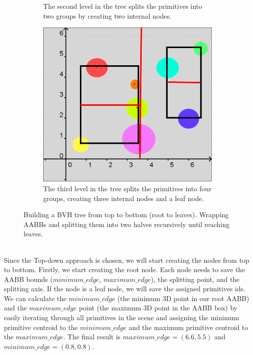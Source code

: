 \documentclass[11pt,a4paper]{article}
\begin{document}
\begin{figure}[h]
\begin{subfigure}[t]{0.3\textwidth}
         \captionsetup{justification=centering,margin=0.1cm}
         \caption{The second level in the tree splits the primitives into two groups by creating two internal nodes.}
         \label{fig:pi_5000}
     \end{subfigure}
     \hfill
     \begin{subfigure}[t]{0.3\textwidth}
         \centering
         \includegraphics[width=\textwidth]{images/example_bvh/4_g.png}
         \captionsetup{justification=centering,margin=0.1cm}
         \caption{The third level in the tree splits the primitives into four groups, creating three internal nodes and a leaf node.}
         \label{fig:pi_18000}
     \end{subfigure}
        \captionsetup{justification=centering,margin=2cm}
        \caption{Building a BVH tree from top to bottom (root to leaves). Wrapping AABBs and splitting them into two halves recursively until reaching leaves.}
        \label{fig:three graphs}
\end{figure}

\noindent
\\
Since the Top-down approach is chosen, we will start creating the nodes from top to bottom. Firstly, we start creating the root node. Each node needs to save the AABB bounds ($minimum\_edge$, $maximum\_edge$), the splitting point, and the splitting axis. If the node is a leaf node, we will save the assigned primitives ids. We can calculate the $minimum\_edge$ (the minimum 3D point in our root AABB) and the $maximum\_edge$ point (the maximum 3D point in the AABB box) by easily iterating through all primitives in the scene and assigning the minimum primitive centroid to the  $minimum\_edge$ and the maximum primitive centroid to the $maximum\_edge$. The final result is $maximum\_edge = (6.6, 5.5)$ and  $minimum\_edge = (0.8,0.8)$.
\end{document}
